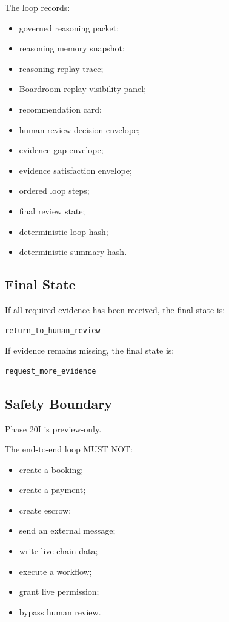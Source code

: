 The loop records:

\begin{itemize}
  \item governed reasoning packet;
  \item reasoning memory snapshot;
  \item reasoning replay trace;
  \item Boardroom replay visibility panel;
  \item recommendation card;
  \item human review decision envelope;
  \item evidence gap envelope;
  \item evidence satisfaction envelope;
  \item ordered loop steps;
  \item final review state;
  \item deterministic loop hash;
  \item deterministic summary hash.
\end{itemize}

\subsection{Final State}

If all required evidence has been received, the final state is:

\begin{verbatim}
return_to_human_review
\end{verbatim}

If evidence remains missing, the final state is:

\begin{verbatim}
request_more_evidence
\end{verbatim}

\subsection{Safety Boundary}

Phase 20I is preview-only.

The end-to-end loop MUST NOT:

\begin{itemize}
  \item create a booking;
  \item create a payment;
  \item create escrow;
  \item send an external message;
  \item write live chain data;
  \item execute a workflow;
  \item grant live permission;
  \item bypass human review.
\end{itemize}

